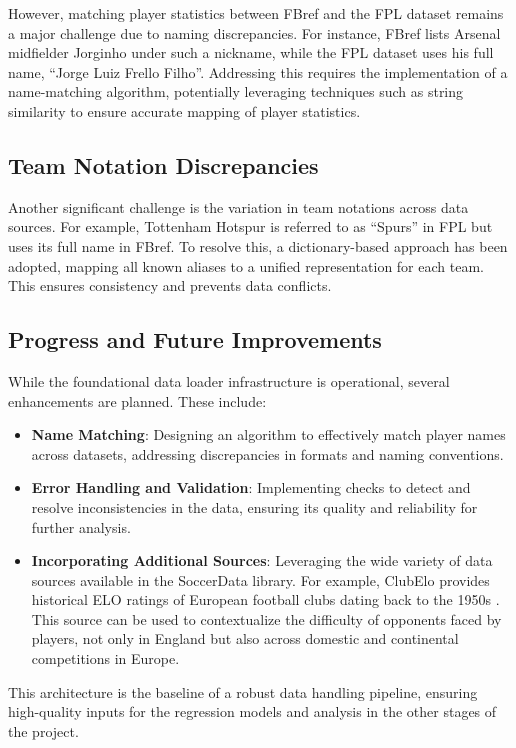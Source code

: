 However, matching player statistics between FBref and the FPL dataset remains a major challenge due to naming discrepancies. For instance, FBref lists Arsenal midfielder Jorginho under such a nickname, while the FPL dataset uses his full name, “Jorge Luiz Frello Filho”. Addressing this requires the implementation of a name-matching algorithm, potentially leveraging techniques such as string similarity to ensure accurate mapping of player statistics.

\subsection{Team Notation Discrepancies}

Another significant challenge is the variation in team notations across data sources. For example, Tottenham Hotspur is referred to as “Spurs” in FPL but uses its full name in FBref. To resolve this, a dictionary-based approach has been adopted, mapping all known aliases to a unified representation for each team. This ensures consistency and prevents data conflicts.

\subsection{Progress and Future Improvements}

While the foundational data loader infrastructure is operational, several enhancements are planned. These include:

\begin{itemize}
    \item \textbf{Name Matching}: Designing an algorithm to effectively match player names across datasets, addressing discrepancies in formats and naming conventions.
    \item \textbf{Error Handling and Validation}: Implementing checks to detect and resolve inconsistencies in the data, ensuring its quality and reliability for further analysis.
    \item \textbf{Incorporating Additional Sources}: Leveraging the wide variety of data sources available in the SoccerData library. For example, ClubElo provides historical ELO ratings of European football clubs dating back to the 1950s \cite{clubelo}. This source can be used to contextualize the difficulty of opponents faced by players, not only in England but also across domestic and continental competitions in Europe.
\end{itemize}

This architecture is the baseline of a robust data handling pipeline, ensuring high-quality inputs for the regression models and analysis in the other stages of the project.

